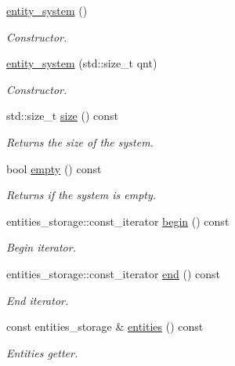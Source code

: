 \begin{DoxyCompactItemize}
\item 
\hyperlink{classophidian_1_1entity__system_1_1entity__system_acf50a10bd13e2f301744ac0f91d09a1c}{entity\-\_\-system} ()
\begin{DoxyCompactList}\small\item\em Constructor. \end{DoxyCompactList}\item 
\hyperlink{classophidian_1_1entity__system_1_1entity__system_af1a9ce40a2e0f1da456a40a7d17b2b60}{entity\-\_\-system} (std\-::size\-\_\-t qnt)
\begin{DoxyCompactList}\small\item\em Constructor. \end{DoxyCompactList}\item 
std\-::size\-\_\-t \hyperlink{classophidian_1_1entity__system_1_1entity__system_a425a7c31b67d64060eecc6bd40a893a2}{size} () const 
\begin{DoxyCompactList}\small\item\em Returns the size of the system. \end{DoxyCompactList}\item 
bool \hyperlink{classophidian_1_1entity__system_1_1entity__system_a9b7719cb544fdf8649b9d5cc5c982dff}{empty} () const 
\begin{DoxyCompactList}\small\item\em Returns if the system is empty. \end{DoxyCompactList}\item 
entities\-\_\-storage\-::const\-\_\-iterator \hyperlink{classophidian_1_1entity__system_1_1entity__system_a0e63d0f9b881ade5e2d398af053196a9}{begin} () const 
\begin{DoxyCompactList}\small\item\em Begin iterator. \end{DoxyCompactList}\item 
entities\-\_\-storage\-::const\-\_\-iterator \hyperlink{classophidian_1_1entity__system_1_1entity__system_add900bad938e0cd62daaaa253a17874f}{end} () const 
\begin{DoxyCompactList}\small\item\em End iterator. \end{DoxyCompactList}\item 
const entities\-\_\-storage \& \hyperlink{classophidian_1_1entity__system_1_1entity__system_aa69eedd1d5352f350049730cc3091154}{entities} () const 
\begin{DoxyCompactList}\small\item\em Entities getter. \end{DoxyCompactList}\item 

\end{DoxyCompactItemize}
